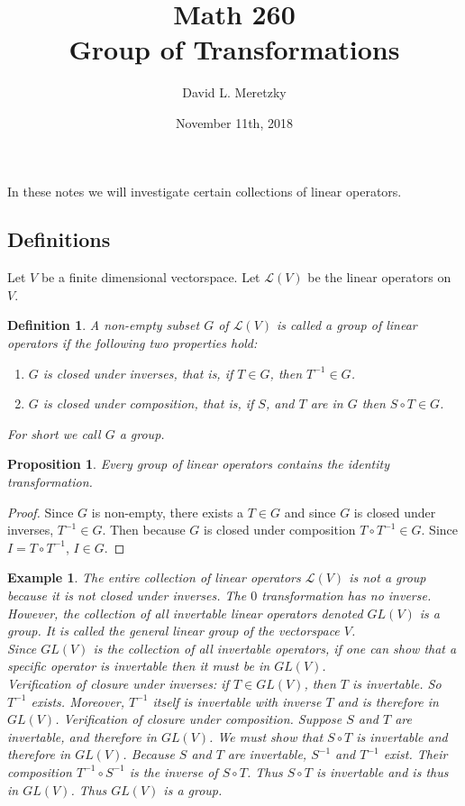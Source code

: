 \documentclass{article}
\title{ \vspace{-10ex} %
Math 260\\
Group of Transformations
}
\author{David L. Meretzky
}
\date{%
November 11th, 2018
}
\theoremstyle{problemstyle}
\newtheorem{proposition}{Proposition}
\newtheorem{example}{Example}
\newtheorem{definition}{Definition}
\begin{document}
\maketitle

In these notes we will investigate certain collections of linear operators. 

\subsection*{Definitions}

Let $V$ be a finite dimensional vectorspace. Let $\mathscr{L}(V)$ be the linear operators on $V$. 

\begin{definition}
A non-empty subset $G$ of $\mathscr{L}(V)$ is called a group of linear operators if the following two properties hold:
\begin{enumerate}
\item $G$ is closed under inverses, that is, if $T \in G$, then $T^{-1} \in G$. 
\item $G$ is closed under composition, that is, if $S$, and $T$ are in $G$ then $S \circ T \in G$.
\end{enumerate}
For short we call $G$ a group. 
\end{definition}

\begin{proposition}
Every group of linear operators contains the identity transformation. 
\end{proposition}

\begin{proof}
Since $G$ is non-empty, there exists a $T \in G$ and since $G$ is closed under inverses, $T^{-1} \in G$. Then because $G$ is closed under composition $T \circ T^{-1} \in G$. Since $I = T \circ T^{-1}$, $I \in G$. 
\end{proof}

\begin{example}
The entire collection of linear operators $\mathscr{L}(V)$ is not a group because it is not closed under inverses. The $0$ transformation has no inverse. However, the collection of all \textit{invertable} linear operators denoted $GL(V)$ is a group. It is called the general linear group of the vectorspace $V$.\\ 

Since $GL(V)$ is the collection of all invertable operators, if one can show that a specific operator is invertable then it must be in $GL(V)$.\\ 

Verification of closure under inverses: if $T \in GL(V)$, then $T$ is invertable. So $T^{-1}$ exists. Moreover, $T^{-1}$ itself is invertable with inverse $T$ and is therefore in $GL(V)$. Verification of closure under composition. Suppose $S$ and $T$ are invertable, and therefore in $GL(V)$. We must show that $S \circ T$ is invertable and therefore in $GL(V)$. Because $S$ and $T$ are invertable, $S^{-1}$ and $T^{-1}$  exist. Their composition $T^{-1} \circ S^{-1}$ is the inverse of $S \circ T$. Thus $S \circ T$ is invertable and is thus in $GL(V)$. Thus $GL(V)$ is a group. 
\end{example}
\end{document}
